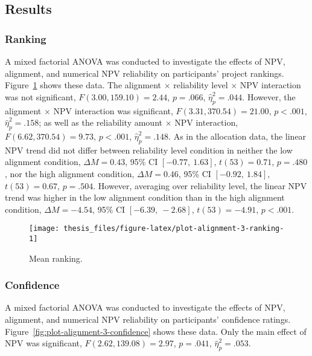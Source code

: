 \documentclass[a4paper, nobind]{templates/ociamthesis}
\theoremstyle{definition}
\theoremstyle{definition}
\theoremstyle{definition}
\theoremstyle{definition}
\theoremstyle{remark}
\begin{document}
\hypertarget{results-alignment-3-appendix}{%
\subsection{Results}\label{results-alignment-3-appendix}}

\subsubsection{Ranking}

A mixed factorial ANOVA was conducted to investigate the effects of NPV,
alignment, and numerical NPV reliability on participants' project rankings.
Figure~\ref{fig:plot-alignment-3-ranking} shows these data. The alignment
\(\times\) reliability level \(\times\) NPV interaction was not
significant,
\(F(3.00, 159.10) = 2.44\), \(p = .066\), \(\hat{\eta}^2_p = .044\).
However, the alignment \(\times\) NPV interaction was significant,
\(F(3.31, 370.54) = 21.00\), \(p < .001\), \(\hat{\eta}^2_p = .158\); as well as the reliability
amount \(\times\) NPV interaction,
\(F(6.62, 370.54) = 9.73\), \(p < .001\), \(\hat{\eta}^2_p = .148\). As in the
allocation data, the linear NPV trend did not differ between reliability level
condition in neither the low alignment condition,
\(\Delta M = 0.43\), 95\% CI \([-0.77,~1.63]\), \(t(53) = 0.71\), \(p = .480\), nor the high alignment
condition, \(\Delta M = 0.46\), 95\% CI \([-0.92,~1.84]\), \(t(53) = 0.67\), \(p = .504\). However,
averaging over reliability level, the linear NPV trend was higher in the low
alignment condition than in the high alignment condition,
\(\Delta M = -4.54\), 95\% CI \([-6.39,~-2.68]\), \(t(53) = -4.91\), \(p < .001\).



\begin{figure}
\texttt{[image: thesis\_files/figure-latex/plot-alignment-3-ranking-1]} \caption{Mean ranking.}\label{fig:plot-alignment-3-ranking}
\end{figure}

\subsubsection{Confidence}

A mixed factorial ANOVA was conducted to investigate the effects of NPV,
alignment, and numerical NPV reliability on participants' confidence ratings.
Figure~\ref{fig:plot-alignment-3-confidence} shows these data. Only the main
effect of NPV was significant,
\(F(2.62, 139.08) = 2.97\), \(p = .041\), \(\hat{\eta}^2_p = .053\).
\end{document}
